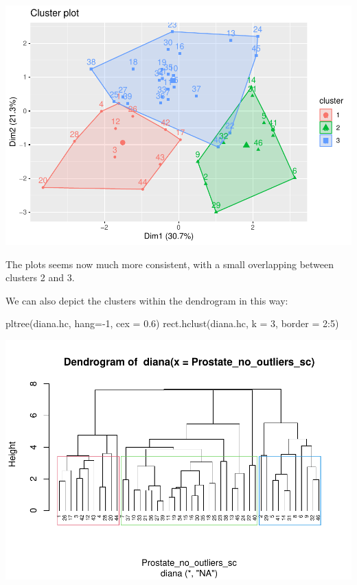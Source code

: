 \documentclass[
]{article}
\newenvironment{Shaded}{\begin{snugshade}}{\end{snugshade}}
\newcommand{\AttributeTok}[1]{\textcolor[rgb]{0.77,0.63,0.00}{#1}}
\newcommand{\DecValTok}[1]{\textcolor[rgb]{0.00,0.00,0.81}{#1}}
\newcommand{\FloatTok}[1]{\textcolor[rgb]{0.00,0.00,0.81}{#1}}
\newcommand{\FunctionTok}[1]{\textcolor[rgb]{0.00,0.00,0.00}{#1}}
\newcommand{\NormalTok}[1]{#1}
\newcommand{\SpecialCharTok}[1]{\textcolor[rgb]{0.00,0.00,0.00}{#1}}
\begin{document}
\includegraphics{clustering_files/figure-latex/unnamed-chunk-43-1.pdf}

The plots seems now much more consistent, with a small overlapping
between clusters 2 and 3.

We can also depict the clusters within the dendrogram in this way:

\begin{Shaded}
\begin{Highlighting}[]
\FunctionTok{pltree}\NormalTok{(diana.hc, }\AttributeTok{hang=}\SpecialCharTok{{-}}\DecValTok{1}\NormalTok{, }\AttributeTok{cex =} \FloatTok{0.6}\NormalTok{)}
\FunctionTok{rect.hclust}\NormalTok{(diana.hc, }\AttributeTok{k =} \DecValTok{3}\NormalTok{, }\AttributeTok{border =} \DecValTok{2}\SpecialCharTok{:}\DecValTok{5}\NormalTok{)}
\end{Highlighting}
\end{Shaded}

\includegraphics{clustering_files/figure-latex/unnamed-chunk-44-1.pdf}
\end{document}

